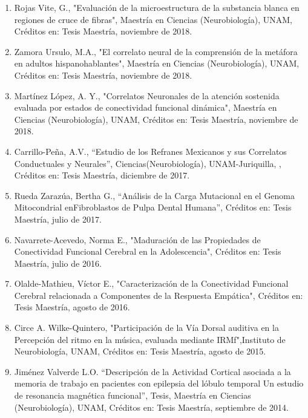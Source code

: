 \documentclass[12pt]{article}
\begin{document}
\begin{enumerate}
\item Rojas Vite, G., "Evaluación de la microestructura de la substancia blanca en regiones de cruce de fibras", Maestría en Ciencias 
(Neurobiología), UNAM, Créditos en: Tesis Maestría, noviembre de 2018.

\item Zamora Ursulo, M.A., "El correlato neural de la comprensión de la metáfora en adultos hispanohablantes", Maestría en Ciencias 
(Neurobiología), UNAM, Créditos en: Tesis Maestría, noviembre de 2018.

\item Martínez López, A. Y., "Correlatos Neuronales de la atención sostenida evaluada por estados de conectividad funcional dinámica", 
Maestría en Ciencias (Neurobiología), UNAM, Créditos en: Tesis Maestría, noviembre de 2018.

\item Carrillo-Peña, A.V., “Estudio de los Refranes Mexicanos y sus Correlatos Conductuales y Neurales”, Ciencias(Neurobiología), 
UNAM-Juriquilla, , Créditos en: Tesis Maestría, diciembre de 2017.

\item Rueda Zarazúa, Bertha G., “Análisis de la Carga Mutacional en el Genoma Mitocondrial enFibroblastos de Pulpa Dental Humana”, 
Créditos en: Tesis Maestría, julio de 2017.

\item Navarrete-Acevedo, Norma E., "Maduración de las Propiedades de Conectividad Funcional Cerebral en la Adolescencia", Créditos en: 
Tesis Maestría, julio de 2016.

\item Olalde-Mathieu, Víctor E., "Caracterización de la Conectividad Funcional Cerebral relacionada a Componentes de la Respuesta 
Empática", Créditos en: Tesis Maestría, agosto de 2016.

\item Circe A. Wilke-Quintero, "Participación de la Vía Dorsal auditiva en la Percepción del ritmo en la música, evaluada mediante 
IRMf",Instituto de Neurobiología, UNAM, Créditos en: Tesis Maestría, agosto de 2015.

\item Jiménez Valverde L.O. “Descripción de la Actividad Cortical asociada a la memoria de trabajo en pacientes con epilepsia del 
lóbulo 
temporal Un estudio de resonancia magnética funcional”, Tesis, Maestría en Ciencias (Neurobiología), UNAM, Créditos en: Tesis Maestría, 
septiembre de 2014.


\end{enumerate}
\end{document}
